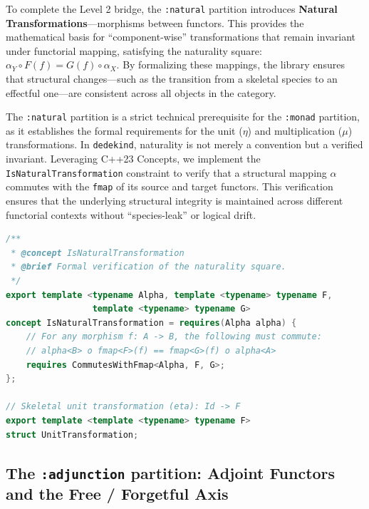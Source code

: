 \documentclass[11pt, a4paper]{report}
\begin{document}
To complete the Level 2 bridge, the \texttt{:natural} partition introduces \textbf{Natural Transformations}—morphisms between functors. This provides the mathematical basis for ``component-wise'' transformations that remain invariant under functorial mapping, satisfying the naturality square: $\alpha_Y \circ F(f) = G(f) \circ \alpha_X$. By formalizing these mappings, the library ensures that structural changes—such as the transition from a skeletal species to an effectful one—are consistent across all objects in the category.

The \texttt{:natural} partition is a strict technical prerequisite for the \texttt{:monad} partition, as it establishes the formal requirements for the unit ($\eta$) and multiplication ($\mu$) transformations. In \texttt{dedekind}, naturality is not merely a convention but a verified invariant. Leveraging C++23 Concepts, we implement the \texttt{IsNaturalTransformation} constraint to verify that a structural mapping $\alpha$ commutes with the \texttt{fmap} of its source and target functors. This verification ensures that the underlying structural integrity is maintained across different functorial contexts without ``species-leak'' or logical drift.

\begin{lstlisting}[language=C++, caption={The Naturality Square: Verifying consistency between Functors.}, label={lst:natural_morphism}]
/** 
 * @concept IsNaturalTransformation
 * @brief Formal verification of the naturality square.
 */
export template <typename Alpha, template <typename> typename F, 
                 template <typename> typename G>
concept IsNaturalTransformation = requires(Alpha alpha) {
    // For any morphism f: A -> B, the following must commute:
    // alpha<B> o fmap<F>(f) == fmap<G>(f) o alpha<A>
    requires CommutesWithFmap<Alpha, F, G>;
};

// Skeletal unit transformation (eta): Id -> F
export template <template <typename> typename F>
struct UnitTransformation;
\end{lstlisting}

\subsection{The \texttt{:adjunction} partition: Adjoint Functors and the Free / Forgetful Axis}
\label{subsec:adjunction-partition}
\end{document}
